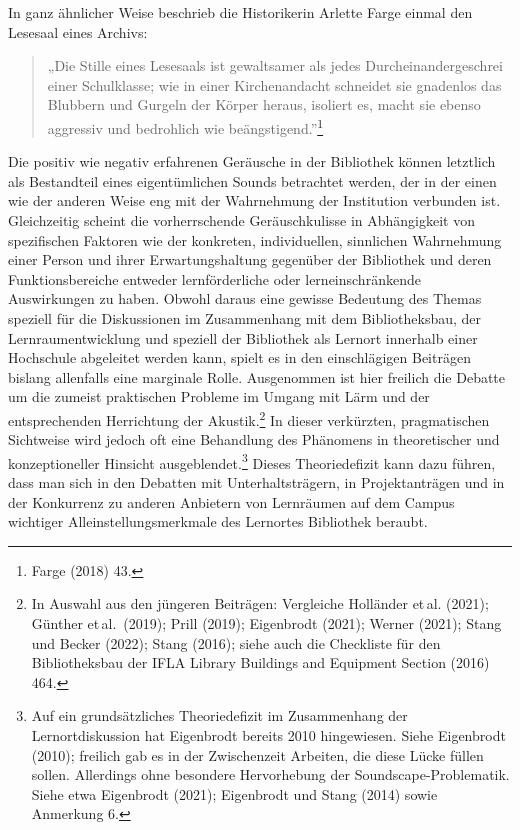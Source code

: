 \documentclass[a4paper,
fontsize=11pt,
oneside,
numbers=noperiodatend,
parskip=half-,
bibliography=totoc,
final
]{scrartcl}
\begin{document}
In ganz ähnlicher Weise beschrieb die Historikerin Arlette Farge einmal
den Lesesaal eines Archivs:

\begin{quote}
„Die Stille eines Lesesaals ist gewaltsamer als jedes
Durcheinandergeschrei einer Schulklasse; wie in einer Kirchenandacht
schneidet sie gnadenlos das Blubbern und Gurgeln der Körper heraus,
isoliert es, macht sie ebenso aggressiv und bedrohlich wie
beängstigend.''\footnote{Farge (2018) 43.}
\end{quote}

Die positiv wie negativ erfahrenen Geräusche in der Bibliothek können
letztlich als Bestandteil eines eigentümlichen Sounds betrachtet werden,
der in der einen wie der anderen Weise eng mit der Wahrnehmung der
Institution verbunden ist. Gleichzeitig scheint die vorherrschende
Geräuschkulisse in Abhängigkeit von spezifischen Faktoren wie der
konkreten, individuellen, sinnlichen Wahrnehmung einer Person und ihrer
Erwartungshaltung gegenüber der Bibliothek und deren Funktionsbereiche
entweder lernförderliche oder lerneinschränkende Auswirkungen zu haben.
Obwohl daraus eine gewisse Bedeutung des Themas speziell für die
Diskussionen im Zusammenhang mit dem Bibliotheksbau, der
Lernraumentwicklung und speziell der Bibliothek als Lernort innerhalb
einer Hochschule abgeleitet werden kann, spielt es in den einschlägigen
Beiträgen bislang allenfalls eine marginale Rolle. Ausgenommen ist hier
freilich die Debatte um die zumeist praktischen Probleme im Umgang mit
Lärm und der entsprechenden Herrichtung der Akustik.\footnote{In Auswahl
  aus den jüngeren Beiträgen: Vergleiche Holländer et\,al. (2021);
  Günther et\,al.~(2019); Prill (2019); Eigenbrodt (2021); Werner
  (2021); Stang und Becker (2022); Stang (2016); siehe auch die
  Checkliste für den Bibliotheksbau der IFLA Library Buildings and
  Equipment Section (2016) 464.} In dieser verkürzten, pragmatischen
Sichtweise wird jedoch oft eine Behandlung des Phänomens in
theoretischer und konzeptioneller Hinsicht ausgeblendet.\footnote{Auf
  ein grundsätzliches Theoriedefizit im Zusammenhang der
  Lernortdiskussion hat Eigenbrodt bereits 2010 hingewiesen. Siehe
  Eigenbrodt (2010); freilich gab es in der Zwischenzeit Arbeiten, die
  diese Lücke füllen sollen. Allerdings ohne besondere Hervorhebung der
  Soundscape-Problematik. Siehe etwa Eigenbrodt (2021); Eigenbrodt und
  Stang (2014) sowie Anmerkung 6.} Dieses Theoriedefizit kann dazu
führen, dass man sich in den Debatten mit Unterhaltsträgern, in
Projektanträgen und in der Konkurrenz zu anderen Anbietern von
Lernräumen auf dem Campus wichtiger Alleinstellungsmerkmale des
Lernortes Bibliothek beraubt.
\end{document}
